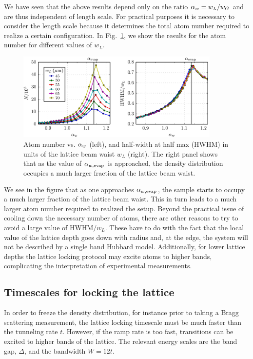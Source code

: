 We have seen that the above results depend only on the ratio $ \alpha_{w}  =
w_{L}/w_{G}$ and are thus independent of length scale.   For practical purposes
it is necessary to consider the length scale because it determines the total
atom number required to realize a certain configuration.  In
Fig.~\ref{fig:alpha_number}, we show the results for the atom number for
different values of $w_{L}$.    
\begin{figure}
    \centering
\includegraphics[width=0.9\textwidth]{../figures/lda_evap_thesis/002.png}
\caption{\small Atom number vs. $ \alpha_{w} $ (left), and
half-width at half max (HWHM) in units of the lattice beam waist $w_{L}$
(right).  The right panel shows that as the value of $ \alpha_{w,\text{evap}} $ is
approached, the density distribution occupies a much larger fraction of the
lattice beam waist.  }
    \label{fig:alpha_number}
\end{figure}
We see in the figure that as one approaches $ \alpha_{w,\text{evap}} $, the sample starts to
occupy a much larger fraction of the lattice beam waist.  This in turn leads to
a much larger atom number required to realized the setup.  Beyond the practical
issue of cooling down the necessary number of atoms, there are other reasons to
try to avoid a large value of $\mathrm{HWHM}/w_{L}$.  These have to do with the
fact that the local value of the lattice depth goes down with radius and, at
the edge, the system will not be described by a single band Hubbard model.
Additionally, for lower lattice depths the lattice locking protocol may excite
atoms to higher bands, complicating the interpretation of experimental
measurements.    

\subsection{Timescales for locking the lattice} 
\label{subsec:locking}

In order to freeze the density distribution, for instance prior to taking a
Bragg scattering measurement,  the lattice locking timescale must be much
faster than the tunneling rate $t$.  However, if the ramp rate is too fast,
transitions can be excited to higher bands of the lattice.   The relevant
energy scales are the band gap, $\Delta$, and the bandwidth $W=12t$.   

